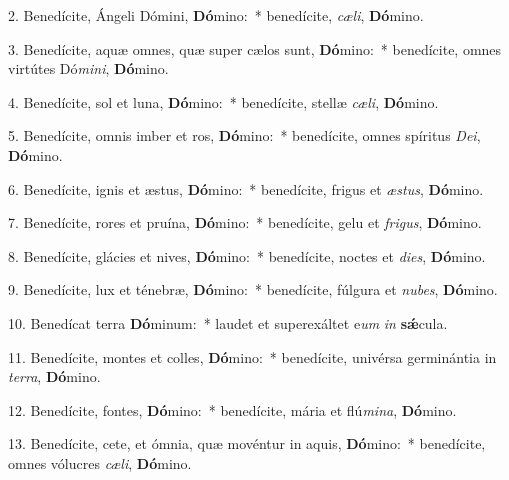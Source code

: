 
2. Benedícite, Ángeli Dómini, \textbf{Dó}mino:~* benedícite, \textit{cæ}\textit{li}, \textbf{Dó}mino.

3. Benedícite, aquæ omnes, quæ super cælos sunt, \textbf{Dó}mino:~* benedícite, omnes virtútes Dó\textit{mi}\textit{ni}, \textbf{Dó}mino.

4. Benedícite, sol et luna, \textbf{Dó}mino:~* benedícite, stellæ \textit{cæ}\textit{li}, \textbf{Dó}mino.

5. Benedícite, omnis imber et ros, \textbf{Dó}mino:~* benedícite, omnes spíritus \textit{De}\textit{i}, \textbf{Dó}mino.

6. Benedícite, ignis et æstus, \textbf{Dó}mino:~* benedícite, frigus et \textit{æs}\textit{tus}, \textbf{Dó}mino.

7. Benedícite, rores et pruína, \textbf{Dó}mino:~* benedícite, gelu et \textit{fri}\textit{gus}, \textbf{Dó}mino.

8. Benedícite, glácies et nives, \textbf{Dó}mino:~* benedícite, noctes et \textit{di}\textit{es}, \textbf{Dó}mino.

9. Benedícite, lux et ténebræ, \textbf{Dó}mino:~* benedícite, fúlgura et \textit{nu}\textit{bes}, \textbf{Dó}mino.

10. Benedícat terra \textbf{Dó}minum:~* laudet et superexáltet e\textit{um} \textit{in} \textbf{s\'{\ae}}cula.

11. Benedícite, montes et colles, \textbf{Dó}mino:~* benedícite, univérsa germinántia in \textit{ter}\textit{ra}, \textbf{Dó}mino.

12. Benedícite, fontes, \textbf{Dó}mino:~* benedícite, mária et flú\textit{mi}\textit{na}, \textbf{Dó}mino.

13. Benedícite, cete, et ómnia, quæ movéntur in aquis, \textbf{Dó}mino:~* benedícite, omnes vólucres \textit{cæ}\textit{li}, \textbf{Dó}mino.

